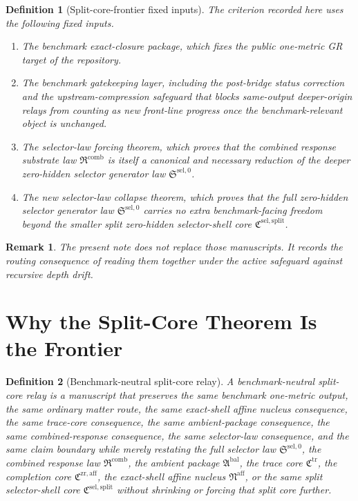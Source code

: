\documentclass[11pt]{article}
\newcommand{\CompletionCore}{\mathfrak C^{\mathrm{zr,aff}}}
\newcommand{\TraceCore}{\mathfrak C^{\mathrm{tr}}}
\newcommand{\AffineNucleus}{\mathfrak N^{\mathrm{aff}}}
\newcommand{\AmbientPackage}{\mathfrak A^{\mathrm{bal}}}
\newcommand{\CombinedLaw}{\mathfrak R^{\mathrm{comb}}}
\newcommand{\SelectorLaw}{\mathfrak S^{\mathrm{sel},0}}
\newcommand{\SelectorCore}{\mathfrak C^{\mathrm{sel,split}}}
\newtheorem{definition}{Definition}
\newtheorem{remark}{Remark}
\begin{document}
\begin{definition}[Split-core-frontier fixed inputs]
The criterion recorded here uses the following fixed inputs.
\begin{enumerate}
    \item The benchmark exact-closure package, which fixes the public one-metric GR target of the repository.
    \item The benchmark gatekeeping layer, including the post-bridge status correction and the upstream-compression safeguard that blocks same-output deeper-origin relays from counting as new front-line progress once the benchmark-relevant object is unchanged.
    \item The selector-law forcing theorem, which proves that the combined response substrate law \(\CombinedLaw\) is itself a canonical and necessary reduction of the deeper zero-hidden selector generator law \(\SelectorLaw\).
    \item The new selector-law collapse theorem, which proves that the full zero-hidden selector generator law \(\SelectorLaw\) carries no extra benchmark-facing freedom beyond the smaller split zero-hidden selector-shell core \(\SelectorCore\).
\end{enumerate}
\end{definition}

\begin{remark}
The present note does not replace those manuscripts. It records the routing consequence of reading them together under the active safeguard against recursive depth drift.
\end{remark}

\section{Why the Split-Core Theorem Is the Frontier}

\begin{definition}[Benchmark-neutral split-core relay]
A \emph{benchmark-neutral split-core relay} is a manuscript that preserves the same benchmark one-metric output, the same ordinary matter route, the same exact-shell affine nucleus consequence, the same trace-core consequence, the same ambient-package consequence, the same combined-response consequence, the same selector-law consequence, and the same claim boundary while merely restating the full selector law \(\SelectorLaw\), the combined response law \(\CombinedLaw\), the ambient package \(\AmbientPackage\), the trace core \(\TraceCore\), the completion core \(\CompletionCore\), the exact-shell affine nucleus \(\AffineNucleus\), or the same split selector-shell core \(\SelectorCore\) without shrinking or forcing that split core further.
\end{definition}
\end{document}

